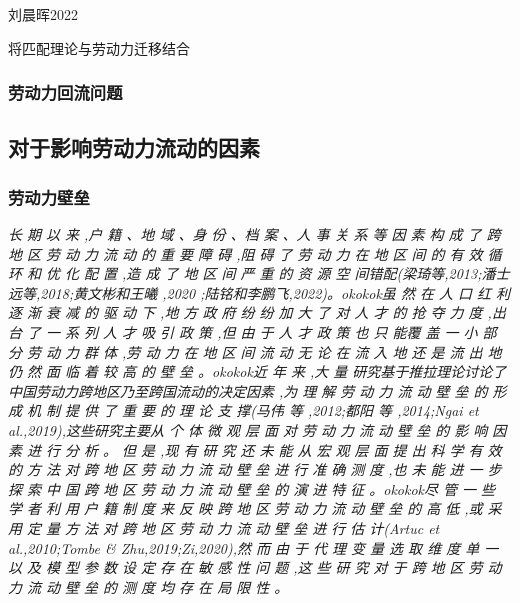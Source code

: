 \documentclass[a4paper,10pt]{article}
\begin{document}
刘晨晖2022\cite{LiuChenHuiLaoDongLiLiuDongJiNengPiPeiYuDiQuJingJiChaiJu2022}

将匹配理论与劳动力迁移结合

\subsubsection{劳动力回流问题}

\cite{RenYuanNongCunWaiChuLaoDongLiHuiLiuQianYiDeYingXiangYinSuHeHuiLiuXiaoYing2017}

\cite{ShiZhiLeiJiaTingBingFuJiaTingJueCeYuNongCunQianYiLaoDongLiHuiLiu2012}



\subsection{对于影响劳动力流动的因素}

\subsubsection{劳动力壁垒}
\textit{长 期 以 来 ,户 籍 、地 域 、身 份 、档 案 、人 事 关 系 等 因 素 构 成 了 跨 地 区 劳 动 力 流 动 的 重 要 障 碍 ,阻 碍 了 劳 动 力 在 地 区 间 的 有 效 循 环 和 优 化 配 置 ,造 成 了 地 区 间 严 重 的 资 源 空 间错配(梁琦等,2013;潘士远等,2018;黄文彬和王曦 ,2020 ;陆铭和李鹏飞,2022)。okokok虽 然 在 人 口 红 利 逐 渐 衰 减 的 驱 动 下 ,地 方 政 府 纷 纷 加 大 了 对 人 才 的 抢 夺 力 度 ,出 台 了 一 系 列 人 才 吸 引 政 策 ,但 由 于 人 才 政 策 也 只 能覆 盖 一 小 部 分 劳 动 力 群 体 ,劳 动 力 在 地 区 间 流 动 无 论 在 流 入 地 还 是 流 出 地 仍 然 面 临 着 较 高 的 壁 垒 。okokok近 年 来 ,大 量 研究基于推拉理论讨论了中国劳动力跨地区乃至跨国流动的决定因素 ,为 理 解 劳 动 力 流 动 壁 垒 的 形 成 机 制 提 供 了 重 要 的 理 论 支 撑(马伟 等 ,2012;都阳 等 ,2014;Ngai et al.,2019),这些研究主要从 个 体 微 观 层 面 对 劳 动 力 流 动 壁 垒 的 影 响 因 素 进 行 分 析 。 但 是 ,现 有 研 究 还 未 能 从 宏 观 层 面 提 出 科 学 有 效 的 方 法 对 跨 地 区 劳 动 力 流 动 壁 垒 进 行 准 确 测 度 ,也 未 能 进 一 步 探 索 中 国 跨 地 区 劳 动 力 流 动 壁 垒 的 演 进 特 征 。okokok尽 管 一 些 学 者 利 用 户 籍 制 度 来 反 映 跨 地 区 劳 动 力 流 动 壁 垒 的 高 低 ,或 采 用 定 量  方 法 对 跨 地 区 劳 动 力 流 动 壁 垒 进 行 估 计(Artuc et al.,2010;Tombe \& Zhu,2019;Zi,2020),然 而 由 于 代 理 变 量 选 取 维 度 单 一 以 及 模 型 参 数 设 定 存 在 敏 感 性 问 题 ,这 些 研 究 对 于 跨 地 区 劳 动 力 流 动 壁 垒 的 测 度 均 存 在 局 限 性 。}
\end{document}
